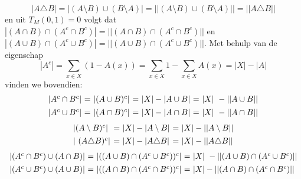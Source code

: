 \begin{displaymath}
| A \triangle B | = | (A \setminus B) \cup (B \setminus A) | = || (A \setminus B) \cup (B \setminus A) || = || A \triangle B ||
\end{displaymath}
en uit $T_M(0,1)=0$ volgt dat 
$|(A \cap B) \cap (A^c \cap B^c)| = ||(A \cap B) \cap (A^c \cap B^c)||$ en
$|(A \cup B) \cap (A^c \cup B^c)| = ||(A \cup B) \cap (A^c \cup B^c)||$.
Met behulp van de eigenschap
\begin{displaymath}
|A^c| = \sum_{x \in X} (1 - A(x)) = \sum_{x \in X} 1 - \sum_{x \in X} A(x) = |X| - |A|
\end{displaymath}
vinden we bovendien:
\begin{displaymath}
\begin{array}{l@{\ =\ }l@{\ =\ }l@{\ =\ }l}
|A^c \cap B^c| & |(A \cup B)^c| & |X| - |A \cup B| & |X| - ||A \cup B|| \\[4pt]
|A^c \cup B^c| & |(A \cap B)^c| & |X| - |A \cap B| & |X| - ||A \cap B||
\end{array}
\end{displaymath}
\begin{displaymath}
\begin{array}{l@{\ =\ }l@{\ =\ }l}
| (A \setminus B)^c | & |X| - |A \setminus B| & |X| - ||A \setminus B|| \\[4pt]
| (A \triangle B)^c | & |X| - |A \triangle B| & |X| - ||A \triangle B||
\end{array}
\end{displaymath}
\begin{displaymath}
\begin{array}{l@{\ =\ }l@{\ =\ }l}
|(A^c \cap B^c) \cup (A \cap B)| & |((A \cup B) \cap (A^c \cup B^c))^c| & |X| - ||(A \cup B) \cap (A^c \cup B^c)|| \\[4pt]
|(A^c \cup B^c) \cup (A \cup B)| & |((A \cap B) \cap (A^c \cap B^c))^c| & |X| - ||(A \cap B) \cap (A^c \cap B^c)||
\end{array}
\end{displaymath}
